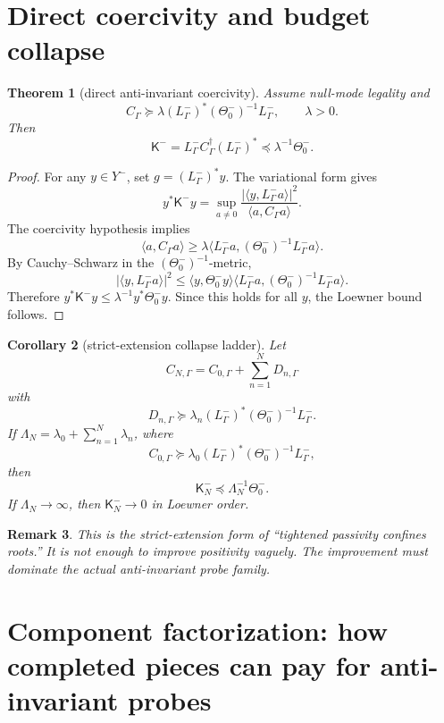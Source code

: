 \documentclass[11pt]{article}
\newtheorem{theorem}{Theorem}
\newtheorem{remark}[theorem]{Remark}
\newtheorem{corollary}[theorem]{Corollary}
\begin{document}
\section{Direct coercivity and budget collapse}

\begin{theorem}[direct anti-invariant coercivity]
Assume null-mode legality and
\[
  C_\Gamma\succeq \lambda (L^-_\Gamma)^*(\Theta^-_0)^{-1}L^-_\Gamma,
  \qquad \lambda>0.
\]
Then
\[
  \mathsf K^-
  =L^-_\Gamma C_\Gamma^\dagger (L^-_\Gamma)^*
  \preceq \lambda^{-1}\Theta^-_0.
\]
\end{theorem}

\begin{proof}
For any \(y\in Y^-\), set \(g=(L^-_\Gamma)^*y\).  The variational form gives
\[
  y^*\mathsf K^-y
  =\sup_{a\ne0}\frac{|\langle y,L^-_\Gamma a\rangle|^2}{\langle a,C_\Gamma a\rangle}.
\]
The coercivity hypothesis implies
\[
  \langle a,C_\Gamma a\rangle
  \ge \lambda\langle L^-_\Gamma a,(\Theta^-_0)^{-1}L^-_\Gamma a\rangle.
\]
By Cauchy--Schwarz in the \((\Theta^-_0)^{-1}\)-metric,
\[
  |\langle y,L^-_\Gamma a\rangle|^2
  \le
  \langle y,\Theta^-_0 y\rangle
  \langle L^-_\Gamma a,(\Theta^-_0)^{-1}L^-_\Gamma a\rangle.
\]
Therefore \(y^*\mathsf K^-y\le \lambda^{-1}y^*\Theta^-_0y\).  Since this holds for all \(y\), the Loewner bound follows.
\end{proof}

\begin{corollary}[strict-extension collapse ladder]
Let
\[
  C_{N,\Gamma}=C_{0,\Gamma}+\sum_{n=1}^N D_{n,\Gamma}
\]
with
\[
  D_{n,\Gamma}\succeq \lambda_n (L^-_\Gamma)^*(\Theta^-_0)^{-1}L^-_\Gamma.
\]
If \(\Lambda_N=\lambda_0+\sum_{n=1}^N\lambda_n\), where
\[
  C_{0,\Gamma}\succeq \lambda_0 (L^-_\Gamma)^*(\Theta^-_0)^{-1}L^-_\Gamma,
\]
then
\[
  \mathsf K^-_N\preceq \Lambda_N^{-1}\Theta^-_0.
\]
If \(\Lambda_N\to\infty\), then \(\mathsf K^-_N\to0\) in Loewner order.
\end{corollary}

\begin{remark}
This is the strict-extension form of ``tightened passivity confines roots.''  It is not enough to improve positivity vaguely.  The improvement must dominate the actual anti-invariant probe family.
\end{remark}

\section{Component factorization: how completed pieces can pay for anti-invariant probes}
\end{document}

